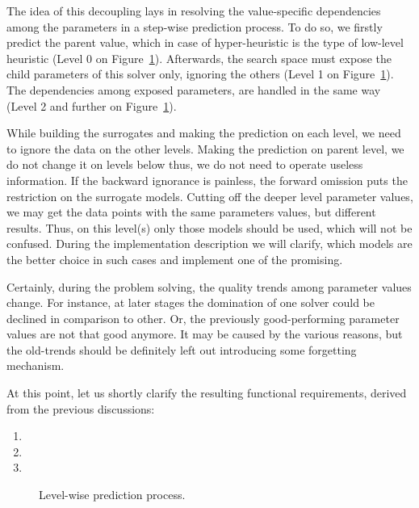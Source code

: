 The idea of this decoupling lays in resolving the value-specific dependencies among the parameters in a step-wise prediction process. To do so, we firstly predict the parent value, which in case of hyper-heuristic is the type of low-level heuristic (Level 0 on Figure~\ref{concept:pict:Level-wise prediction process}). Afterwards, the search space must expose the child parameters of this solver only, ignoring the others (Level 1 on Figure~\ref{concept:pict:Level-wise prediction process}). The dependencies among exposed parameters, are handled in the same way (Level 2 and further on Figure~\ref{concept:pict:Level-wise prediction process}).

While building the surrogates and making the prediction on each level, we need to ignore the data on the other levels. Making the prediction on parent level, we do not change it on levels below thus, we do not need to operate useless information. If the backward ignorance is painless, the forward omission puts the restriction on the surrogate models. Cutting off the deeper level parameter values, we may get the data points with the same parameters values, but different results. Thus, on this level(s) only those models should be used, which will not be confused. During the implementation description we will clarify, which models are the better choice in such cases and implement one of the promising.

Certainly, during the problem solving, the quality trends among parameter values change. For instance, at later stages the domination of one solver could be declined in comparison to other. Or, the previously good-performing parameter values are not that good anymore. It may be caused by the various reasons, but the old-trends should be definitely left out introducing some forgetting mechanism.

At this point, let us shortly clarify the resulting functional requirements, derived from the previous discussions:
\begin{enumerate}[itemsep=8pt]
	\item[F.R.1]
	
	\item[F.R.2]
	
	\item[F.R.3]
\end{enumerate}

\begin{figure}
	\centering
	
	\caption{Level-wise prediction process.}
	\label{concept:pict:Level-wise prediction process}
\end{figure}

